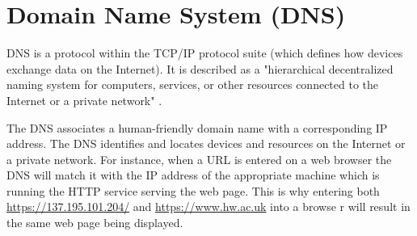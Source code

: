 \chapter{Domain Name System (DNS)}

DNS is a protocol within the TCP/IP protocol suite (which defines how
devices exchange data on the Internet). It is described as a "hierarchical
decentralized naming system for computers, services, or other resources
connected to the Internet or a private
network" \cite{dnswiki}.

The DNS associates a human-friendly domain name with a corresponding IP
address. The DNS identifies and locates devices and resources on the Internet
or a private network. For instance, when a URL is entered on a web browser the
DNS will match it with the IP address of the appropriate machine which is
running the HTTP service serving the web page. This is why entering both
\url{https://137.195.101.204/} and \url{https://www.hw.ac.uk} into a browse
r will result in the same web page being displayed.